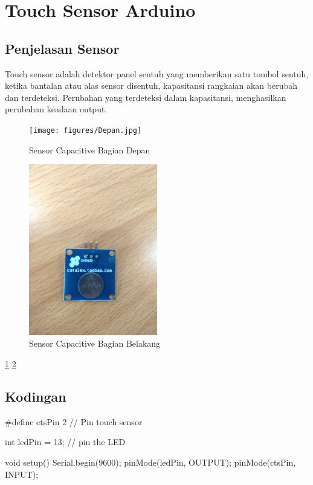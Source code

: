 \section{Touch Sensor Arduino}
	\subsection{Penjelasan Sensor}
		Touch sensor adalah detektor panel sentuh yang memberikan satu tombol sentuh, ketika bantalan atau alas sensor disentuh, kapasitansi rangkaian akan berubah dan terdeteksi. Perubahan yang terdeteksi dalam kapasitansi, menghasilkan perubahan keadaan output.
		
		\begin{figure}[ht]
			\centerline{\texttt{[image: figures/Depan.jpg]}}
			\caption{Sensor Capacitive Bagian Depan}
			\label{Depan}
			\end{figure}
			
		\begin{figure}[ht]
			\centerline{\includegraphics[width=0.5\textwidth]{figures/Belakang.jpg}}
			\caption{Sensor Capacitive Bagian Belakang}
			\label{Belakang}
			\end{figure}
			
		\ref{Depan}
		\ref{Belakang}
		
		
	\subsection{Kodingan}
	\begingroup\makeatletter{}
		\verbatim
		#define ctsPin 2 // Pin touch sensor
 
		int ledPin = 13; // pin the LED
 
		void setup() {
		  Serial.begin(9600);
		  pinMode(ledPin, OUTPUT);  
		  pinMode(ctsPin, INPUT);
		}
		 
